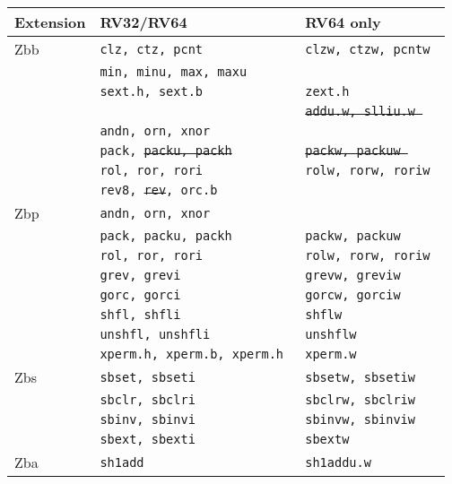 \begin{table}[!h]
\begin{center}
\begin{tabular}{lll}
Extension & RV32/RV64 & RV64 only \\
\hline
Zbb
 & {\tt clz, ctz, pcnt            } & {\tt clzw, ctzw, pcntw         } \\
 & {\tt min, minu, max, maxu      } & {\tt                           } \\
 & {\tt sext.h, sext.b            } & {\tt zext.h                    } \\
 & {\tt                           } & \sout{\tt addu.w, slliu.w      } \\
 & {\tt andn, orn, xnor           } & {\tt                           } \\
 & {\tt pack, \sout{packu, packh} } & \sout{\tt packw, packuw        } \\
 & {\tt rol, ror, rori            } & {\tt rolw, rorw, roriw         } \\
 & {\tt rev8, \sout{rev}, orc.b   } & {\tt                           } \\
\hline
Zbp
 & {\tt andn, orn, xnor           } & {\tt                           } \\
 & {\tt pack, packu, packh        } & {\tt packw, packuw             } \\
 & {\tt rol, ror, rori            } & {\tt rolw, rorw, roriw         } \\
 & {\tt grev, grevi               } & {\tt grevw, greviw             } \\
 & {\tt gorc, gorci               } & {\tt gorcw, gorciw             } \\
 & {\tt shfl, shfli               } & {\tt shflw                     } \\
 & {\tt unshfl, unshfli           } & {\tt unshflw                   } \\
 & {\tt xperm.h, xperm.b, xperm.h } & {\tt xperm.w                   } \\
\hline
Zbs
 & {\tt sbset, sbseti             } & {\tt sbsetw, sbsetiw           } \\
 & {\tt sbclr, sbclri             } & {\tt sbclrw, sbclriw           } \\
 & {\tt sbinv, sbinvi             } & {\tt sbinvw, sbinviw           } \\
 & {\tt sbext, sbexti             } & {\tt sbextw                    } \\
\hline
Zba
 & {\tt sh1add                    } & {\tt sh1addu.w                 } \\

\end{tabular}
\end{center}
\end{table}
